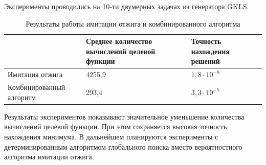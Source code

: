 \documentclass[11pt, oneside, a4paper]{article}
\begin{document}
Эксперименты проводились на 10-ти двумерных задачах из генератора GKLS.
\begin{table}
	\caption{Результаты работы имитации отжига и комбинированного алгоритма}
	\begin{center}
		\begin{tabular}{|m{3.8cm}|m{6cm} |m{6cm}|}
			\hline
			 & Среднее количество вычислений целевой функции & Точность нахождения решений\\
			 \hline
			 Имитация отжига & 4255,9 & $1,8 \cdot 10^{-8}$\\
			 \hline 
			 Комбинированный алгоритм & 293,4 & $3,3 \cdot 10^{-5}$\\
			 \hline
		\end{tabular}
	\end{center}
\end{table}
Результаты экспериментов показывают значительное уменьшение количества вычислений целевой функции. При этом сохраняется высокая точность нахождения минимума. В дальнейшем планируются эксперименты с детерминированным алгоритмом глобального поиска вместо вероятностного алгоритма имитации отжига.
\end{document}
